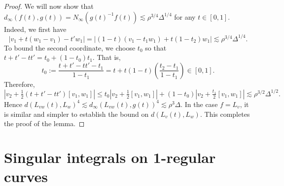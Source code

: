 \documentclass[11pt]{amsart}
\theoremstyle{definition}
\numberwithin{theorem}{section} \numberwithin{equation}{section}
\begin{document}
\begin{proof}
We will now show that $d_{\infty}(f(t),g(t)) = N_{\infty}(g(t)^{-1}f(t)) \lesssim \rho^{3/4} \Delta^{1/4}$ for any $t\in[0,1]$.
Indeed, we first have
$$
|v_1 + t(w_1-v_1) - t'w_1| = |(1-t)(v_1-t_1w_1) + t(1-t_2)w_1| \lesssim \rho^{3/4} \Delta^{1/4}.
$$
To bound the second coordinate, we choose $t_0$ so that $t+t'-tt' = t_0 +  (1-t_0)t_1$.
That is,
$$
t_0 := \frac{t+t'-tt' -t_1}{1-t_1} = t + t(1-t)\left( \frac{t_2-t_1}{1-t_1} \right) \in [0,1].
$$
Therefore,
$$
\left|v_2 + \tfrac12(t+t'-tt')[v_1,w_1]\right| 
\leq t_0\left|v_2 + \tfrac12[v_1,w_1]\right|
 + (1-t_0)\left|v_2 + \tfrac{t_1}{2}[v_1,w_1]\right|
\lesssim \rho^{3/2} \Delta^{1/2}.
$$
Hence $d(L_{vw}(t),L_w)^4 \lesssim d_{\infty}(L_{vw}(t),g(t))^4 \lesssim \rho^3 \Delta$.
In the case $f = L_v$, 
it is similar and simpler to establish the bound on $d(L_v(t),L_w)$.
This completes the proof of the lemma.
\end{proof}




\section{Singular integrals on 1-regular curves}
\label{SIOSec}
\end{document}
